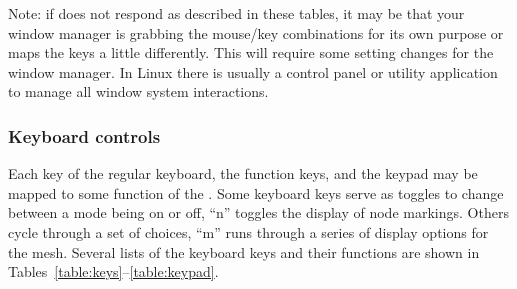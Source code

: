 Note: if \map{} does not respond as described in these tables, it may be
that your window manager is grabbing the mouse/key combinations for its own
purpose or maps the keys a little differently.  This will require some
setting changes for the window manager.  In Linux there is usually a
control panel or utility application to manage all window system
interactions.


\subsubsection{Keyboard controls}
\label{sec:control-keys} 

Each key of the regular keyboard, the function keys, and the keypad may be
mapped to some function of the \map{}.  Some keyboard keys serve as toggles
to change between a mode being on or off, \eg{} ``n'' toggles the display
of node markings.  Others cycle through a set of choices, \eg{} ``m'' runs
through a series of display options for the mesh.  Several lists of the
keyboard keys and their functions are shown in
Tables~\ref{table:keys}--\ref{table:keypad}.

